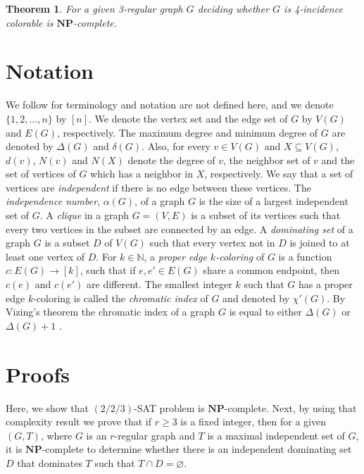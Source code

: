 \documentclass[
final
]{dmtcs-episciences}
\newtheorem{prethm}{{\bf Theorem}}
\newenvironment{thm}{\begin{prethm}{\hspace{-0.5
				em}{\bf}}}{\end{prethm}}
\begin{document}
\begin{thm}\label{TF}
	For a given 3-regular graph $G$ deciding whether $G$ is 4-incidence colorable  is $ \mathbf{NP} $-complete.
\end{thm}

\section{Notation}

We follow \cite{MR1567289, MR1367739} for terminology and
notation are not defined here, and we denote $\{1,2,\ldots,n\}$ by $[n]$.
We denote the vertex set and the edge set of
$G$ by $V(G)$ and $E(G)$, respectively. The maximum degree
and minimum degree of $G$ are denoted by $\Delta(G)$ and $\delta(G)$.
Also, for every $v\in V (G)$ and $X \subseteq V(G)$, $d(v)$, $N(v)$ and $N(X)$  denote the degree of $v$,  the neighbor set of $v$
and the set of vertices of $G$ which has a neighbor in $X$, respectively.
We say that a set of vertices are {\it independent} if there is no edge
between these vertices.
The {\it independence number}, $\alpha(G)$, of a graph $G$ is the size of a largest independent set of
$G$.
A {\it clique} in a  graph $G = (V, E)$  is a subset of its vertices such that every two vertices in the subset are connected by an edge.
A {\it dominating set} of a graph $G$ is a subset $D$ of $V(G)$ such that every vertex
not in $D$ is joined to at least one vertex  of $D$.
For $ k\in \mathbb{N} $, a {\it proper edge $k$-coloring} of $G$ is a function $c:
E(G)\rightarrow [k]$, such that if $e,e'\in E(G)$ share a common endpoint,
then $c(e)$ and $c(e')$ are different.
The smallest integer $k$ such that
$G$ has a proper edge $k$-coloring is called the {\it chromatic index} of $G$ and denoted by $\chi '(G)$. By Vizing's theorem   the chromatic index of a graph $G$ is equal to either $ \Delta(G) $ or $ \Delta(G) +1 $ \cite{MR0180505}.


\section{Proofs}

Here, we show that   $(2/2/3)$-SAT problem is $ \mathbf{NP} $-complete. Next, by using  that complexity result we prove that if 
$r\geq 3$ is a fixed integer, then for a given $(G,T)$, where $G$ is an $r$-regular graph and $T$ is  a  maximal independent set of $G$, it  is $ \mathbf{NP} $-complete to determine whether
there is an independent dominating set $D$ that dominates $T $ such that $  T \cap D =\varnothing $.
\end{document}
